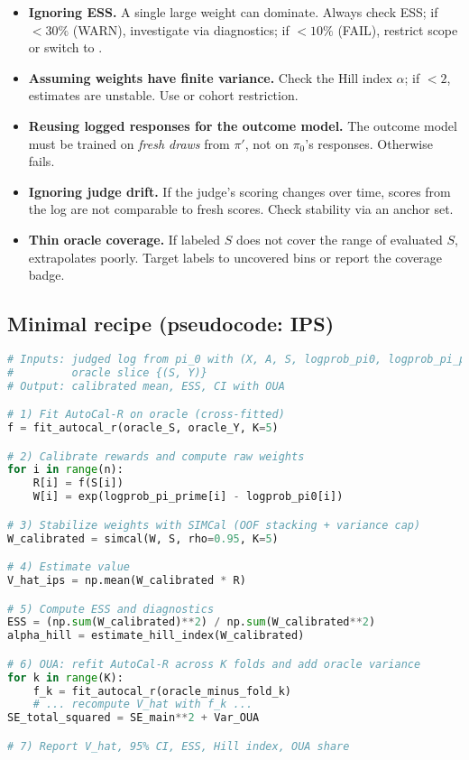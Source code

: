 \begin{itemize}
\item \textbf{Ignoring ESS.} A single large weight can dominate. Always check ESS; if $< 30\%$ (WARN), investigate via diagnostics; if $< 10\%$ (FAIL), restrict scope or switch to \dr.

\item \textbf{Assuming weights have finite variance.} Check the Hill index $\alpha$; if $< 2$, estimates are unstable. Use \simcal{} or cohort restriction.

\item \textbf{Reusing logged responses for the outcome model.} The outcome model must be trained on \emph{fresh draws} from $\pi'$, not on $\pi_0$'s responses. Otherwise \dr{} fails.

\item \textbf{Ignoring judge drift.} If the judge's scoring changes over time, scores from the log are not comparable to fresh scores. Check stability via an anchor set.

\item \textbf{Thin oracle coverage.} If labeled $S$ does not cover the range of evaluated $S$, \autocal{} extrapolates poorly. Target labels to uncovered bins or report the coverage badge.
\end{itemize}

\subsection{Minimal recipe (pseudocode: IPS)}

\begin{lstlisting}[language=Python,caption=Calibrated IPS Recipe]
# Inputs: judged log from pi_0 with (X, A, S, logprob_pi0, logprob_pi_prime)
#         oracle slice {(S, Y)}
# Output: calibrated mean, ESS, CI with OUA

# 1) Fit AutoCal-R on oracle (cross-fitted)
f = fit_autocal_r(oracle_S, oracle_Y, K=5)

# 2) Calibrate rewards and compute raw weights
for i in range(n):
    R[i] = f(S[i])
    W[i] = exp(logprob_pi_prime[i] - logprob_pi0[i])

# 3) Stabilize weights with SIMCal (OOF stacking + variance cap)
W_calibrated = simcal(W, S, rho=0.95, K=5)

# 4) Estimate value
V_hat_ips = np.mean(W_calibrated * R)

# 5) Compute ESS and diagnostics
ESS = (np.sum(W_calibrated)**2) / np.sum(W_calibrated**2)
alpha_hill = estimate_hill_index(W_calibrated)

# 6) OUA: refit AutoCal-R across K folds and add oracle variance
for k in range(K):
    f_k = fit_autocal_r(oracle_minus_fold_k)
    # ... recompute V_hat with f_k ...
SE_total_squared = SE_main**2 + Var_OUA

# 7) Report V_hat, 95% CI, ESS, Hill index, OUA share
\end{lstlisting}

